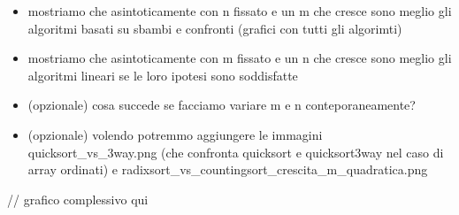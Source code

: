 \documentclass[a4paper, 12pt, oneside]{book}
\begin{document}
\begin{itemize}
    \item mostriamo che asintoticamente con n fissato e un m che cresce sono meglio gli algoritmi basati su sbambi e confronti (grafici con tutti gli algorimti)
    \item mostriamo che asintoticamente con m fissato e un n che cresce sono meglio gli algoritmi lineari se le loro ipotesi sono soddisfatte
    \item (opzionale) cosa succede se facciamo variare m e n conteporaneamente?
    \item (opzionale) volendo potremmo aggiungere le immagini quicksort_vs_3way.png (che confronta quicksort e quicksort3way nel caso di array ordinati) e radixsort_vs_countingsort_crescita_m_quadratica.png
\end{itemize}

// grafico complessivo qui

\end{document}
